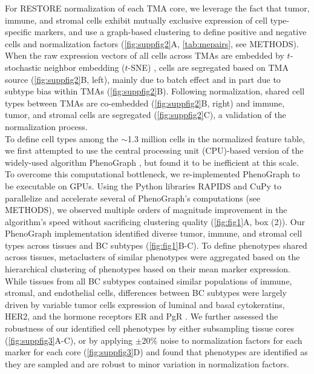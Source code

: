 \documentclass[preprint,review,3p,12pt]{elsarticle}
\begin{document}
For RESTORE normalization \cite{Chang2020} of each TMA core, we leverage the fact that tumor, immune, and stromal cells exhibit mutually exclusive expression of cell type-specific markers, and use a graph-based clustering to define positive and negative cells and normalization factors (\autoref{fig:suppfig2}A, \autoref{tab:mepairs}, see METHODS). When the raw expression vectors of all cells across TMAs are embedded by $t$-stochastic neighbor embedding ($t$-SNE) \cite{tsne2008}, cells are segregated based on TMA source (\autoref{fig:suppfig2}B, left), mainly due to batch effect and in part due to subtype bias within TMAs (\autoref{fig:suppfig2}B). Following normalization, shared cell types between TMAs are co-embedded (\autoref{fig:suppfig2}B, right) and immune, tumor, and stromal cells are segregated (\autoref{fig:suppfig2}C), a validation of the normalization process.\\

To define cell types among the $\sim$1.3 million cells in the normalized feature table, we first attempted to use the central processing unit (CPU)-based version of the widely-used algorithm PhenoGraph \cite{Levine2015}, but found it to be inefficient at this scale. To overcome this computational bottleneck, we re-implemented PhenoGraph to be executable on GPUs. Using the Python libraries RAPIDS \cite{cuml2020} and CuPy \cite{cupy2017} to parallelize and accelerate several of PhenoGraph's computations (see METHODS), we observed multiple orders of magnitude improvement in the algorithm's speed without sacrificing clustering quality (\autoref{fig:fig1}A, box (2)). Our PhenoGraph implementation identified diverse tumor, immune, and stromal cell types across tissues and BC subtypes (\autoref{fig:fig1}B-C). To define phenotypes shared across tissues, metaclusters of similar phenotypes were aggregated based on the hierarchical clustering of phenotypes based on their mean marker expression. While tissues from all BC subtypes contained similar populations of immune, stromal, and endothelial cells, differences between BC subtypes were largely driven by variable tumor cells expression of luminal and basal cytokeratins, HER2, and the hormone receptors ER and PgR \cite{jackson_single-cell_2020}. We further assessed the robustness of our identified cell phenotypes by either subsampling tissue cores (\autoref{fig:suppfig3}A-C), or by applying $\pm20\%$ noise to normalization factors for each marker for each core (\autoref{fig:suppfig3}D) and found that phenotypes are identified as they are sampled and are robust to minor variation in normalization factors.\\
\end{document}

